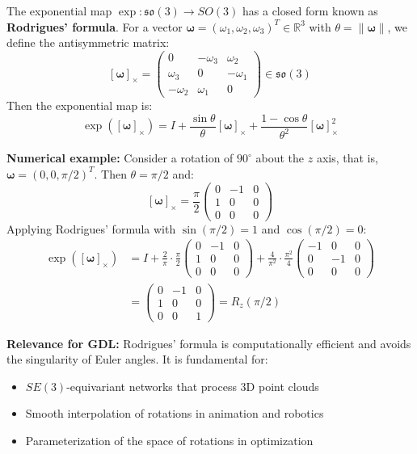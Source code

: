 \begin{example}\label{ex:mapa_exp_so3}
	The exponential map $\exp: \mathfrak{so}(3) \to SO(3)$ has a closed form known as \textbf{Rodrigues' formula}. For a vector $\boldsymbol{\omega} = (\omega_1, \omega_2, \omega_3)^T \in \mathbb{R}^3$ with $\theta = \|\boldsymbol{\omega}\|$, we define the antisymmetric matrix:
	\[
		[\boldsymbol{\omega}]_\times = \begin{pmatrix}
			0 & -\omega_3 & \omega_2 \\
			\omega_3 & 0 & -\omega_1 \\
			-\omega_2 & \omega_1 & 0
		\end{pmatrix} \in \mathfrak{so}(3)
	\]
	Then the exponential map is:
	\begin{equation}\label{eq:rodrigues}
		\exp([\boldsymbol{\omega}]_\times) = I + \frac{\sin\theta}{\theta} [\boldsymbol{\omega}]_\times + \frac{1 - \cos\theta}{\theta^2} [\boldsymbol{\omega}]_\times^2
	\end{equation}

	\textbf{Numerical example:} Consider a rotation of $90^\circ$ about the $z$ axis, that is, $\boldsymbol{\omega} = (0, 0, \pi/2)^T$. Then $\theta = \pi/2$ and:
	\[
		[\boldsymbol{\omega}]_\times = \frac{\pi}{2} \begin{pmatrix}
			0 & -1 & 0 \\
			1 & 0 & 0 \\
			0 & 0 & 0
		\end{pmatrix}
	\]
	Applying Rodrigues' formula with $\sin(\pi/2) = 1$ and $\cos(\pi/2) = 0$:
	\begin{align*}
		\exp([\boldsymbol{\omega}]_\times) &= I + \frac{2}{\pi} \cdot \frac{\pi}{2} \begin{pmatrix}
			0 & -1 & 0 \\
			1 & 0 & 0 \\
			0 & 0 & 0
		\end{pmatrix} + \frac{4}{\pi^2} \cdot \frac{\pi^2}{4} \begin{pmatrix}
			-1 & 0 & 0 \\
			0 & -1 & 0 \\
			0 & 0 & 0
		\end{pmatrix} \\
		&= \begin{pmatrix}
			0 & -1 & 0 \\
			1 & 0 & 0 \\
			0 & 0 & 1
		\end{pmatrix} = R_z(\pi/2)
	\end{align*}

	\textbf{Relevance for GDL:} Rodrigues' formula is computationally efficient and avoids the singularity of Euler angles. It is fundamental for:
	\begin{itemize}
		\item $SE(3)$-equivariant networks that process 3D point clouds
		\item Smooth interpolation of rotations in animation and robotics
		\item Parameterization of the space of rotations in optimization
	\end{itemize}
\end{example}

